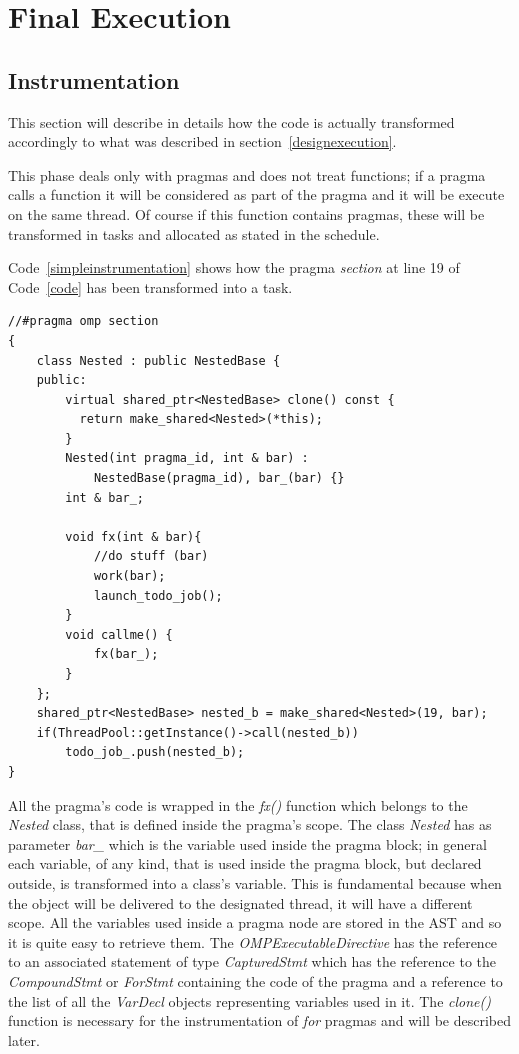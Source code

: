 \documentclass[a4paper,12pt,oneside]{book}
\begin{document}
\section{Final Execution}
\subsection{Instrumentation}
This section will describe in details how the code is actually transformed accordingly to what was described in section~\ref{designexecution}.

This phase deals only with pragmas and does not treat functions; if a pragma calls a function it will be considered as part of the pragma and it will be execute on the same thread. Of course if this function contains pragmas, these will be transformed in tasks and allocated as stated in the schedule.

Code~\ref{simpleinstrumentation} shows how the pragma \emph{section} at line 19 of Code~\ref{code} has been transformed into a task.

\begin{lstlisting}[language=CCC, caption=Example of an instrumented \emph{section} pragma from Code~\ref{code}., label=simpleinstrumentation]
 //#pragma omp section
{
    class Nested : public NestedBase {
    public: 
        virtual shared_ptr<NestedBase> clone() const { 
          return make_shared<Nested>(*this); 
        } 
        Nested(int pragma_id, int & bar) : 
            NestedBase(pragma_id), bar_(bar) {}
        int & bar_;
            
        void fx(int & bar){   
            //do stuff (bar)
            work(bar);
            launch_todo_job(); 
        }
        void callme() {
            fx(bar_);
        }
    };
    shared_ptr<NestedBase> nested_b = make_shared<Nested>(19, bar);                             
    if(ThreadPool::getInstance()->call(nested_b)) 
        todo_job_.push(nested_b); 
}
\end{lstlisting}

All the pragma’s code is wrapped in the \emph{fx()} function which belongs to the \emph{Nested} class, that is defined inside the pragma’s scope. The class \emph{Nested} has as parameter \emph{bar\_} which is the variable used inside the pragma block; in general each variable, of any kind, that is used inside the pragma block, but declared outside, is transformed into a class's variable. This is fundamental because when the object will be delivered to the designated thread, it will have a different scope. All the variables used inside a pragma node are stored in the AST and so it is quite easy to retrieve them. The \emph{OMPExecutableDirective} has the reference to an associated statement of type \emph{CapturedStmt} which has the reference to the \emph{CompoundStmt} or \emph{ForStmt} containing the code of the pragma and a reference to the list of all the \emph{VarDecl} objects representing variables used in it. The \emph{clone()} function is necessary for the instrumentation of \emph{for} pragmas and will be described later.
\end{document}
